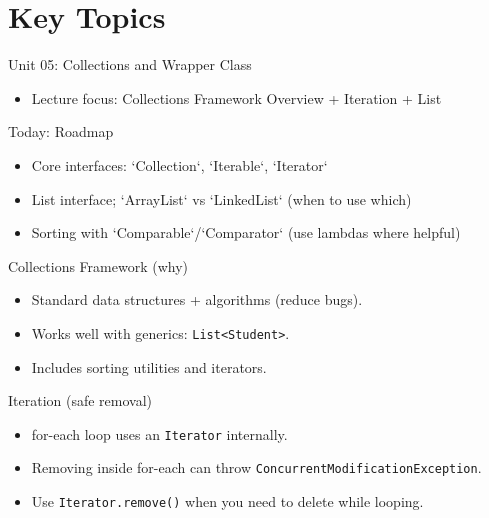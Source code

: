 \documentclass{beamer}
\begin{document}
\section{Key Topics}
\label{sec:concepts}

\begin{frame}{Unit 05: Collections and Wrapper Class}
  \begin{itemize}[<+->]
    \item Lecture focus: Collections Framework Overview + Iteration + List
  \end{itemize}
  \slidesources{\OOPSUnitVSources}
\end{frame}

\begin{frame}{Today: Roadmap}
  \begin{itemize}[<+->]
    \item Core interfaces: `Collection`, `Iterable`, `Iterator`
    \item List interface; `ArrayList` vs `LinkedList` (when to use which)
    \item Sorting with `Comparable`/`Comparator` (use lambdas where helpful)
  \end{itemize}
  \slidesources{\OOPSUnitVSources}
\end{frame}

\begin{frame}{Collections Framework (why)}
  \begin{itemize}[<+->]
    \item Standard data structures + algorithms (reduce bugs).
    \item Works well with generics: \texttt{List<Student>}.
    \item Includes sorting utilities and iterators.
  \end{itemize}
  \slidesources{\OOPSUnitVSources}
\end{frame}

\begin{frame}{Iteration (safe removal)}
  \begin{itemize}[<+->]
    \item for-each loop uses an \texttt{Iterator} internally.
    \item Removing inside for-each can throw \texttt{ConcurrentModificationException}.
    \item Use \texttt{Iterator.remove()} when you need to delete while looping.
  \end{itemize}
  \slidesources{\OOPSUnitVSources}
\end{frame}
\end{document}
